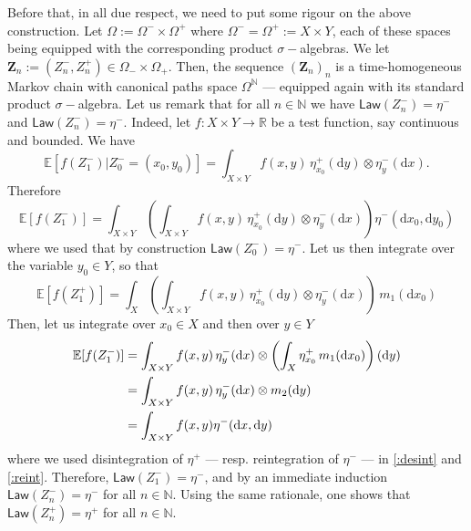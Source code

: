 \documentclass[leqno, 11pt, a4paper]{amsart}
\theoremstyle{definition}
\newcommand{\cZ}{\mathbf{Z}}
\newcommand{\R}{\mathbb{R}}
\newcommand{\E}{\mathbb{E}}
\newcommand{\N}{\mathbb{N}}
\newcommand{\law}{\textsf{Law}}
\newcommand{\dd}{\mathrm{d}}
\begin{document}
 Before that, in all due respect, we need to put some rigour on the above construction. Let $\Omega := \Omega^- \times \Omega^+$ where $\Omega^- = \Omega^+ := X \times Y$, each of these spaces being equipped with the corresponding product $\sigma-$algebras. We let $\cZ_n := (Z_n^-, Z_n^+) \in \Omega_- \times \Omega_+$. Then, the sequence $(\cZ_n)_n$ is a time-homogeneous Markov chain with canonical paths space $\Omega^\N$ --- equipped again with its standard product $\sigma-$algebra. Let us remark that for all $n \in \N$ we have $\law(Z_n^-) = \eta^-$ and $\law(Z_n^-) = \eta^{-}$. Indeed, let $f : X \times Y \to \R$ be a test function, say continuous and bounded. We have
$$
 	\E[f(Z_1^-) | Z_{0}^- = (x_0, y_0)] = \int_{X \times Y} f(x, y) \,  \eta^+_{x_{0}}(\dd y) \otimes \eta^-_y(\dd x).
$$
 Therefore
$$
 	\E[f(Z_1^-)] = \int_{X \times Y }\left(\int_{X \times Y } f(x, y) \, \eta^+_{x_{0}}(\dd y) \otimes \eta^-_y(\dd x)\right) \eta^-(\dd x_{0},\dd  y_{0})
$$
 where we used that by construction $\law(Z_0^-) = \eta^-$. Let us then integrate over the variable $y_{0} \in Y$, so that
$$
 	\E[f(Z_1^+)] = \int_{X}\left(\int_{X \times Y } f(x, y) \,  \eta^+_{x_{0}}(\dd y) \otimes \eta^-_y(\dd x)\right) \, m_1(\dd x_0)
$$
 Then, let us integrate over $x_0 \in X$ and then over $y \in Y$
 \begin{align}
 	\notag \E[f(Z_1^-)]  &= \int_{X \times Y} f(x, y)\,  \eta^-_y(\dd x) \otimes \left(\int_{X} \eta^+_{x_{0}} \,  m_1(\dd x_0 )\right)(\dd y)
 	\\ 	\label{:desint}& = \int_{X \times Y} f(x, y) \, \eta^-_y(\dd x) \otimes m_2(\dd y)
 	\\ \label{:reint}&= \int_{X \times Y} f(x, y) \eta^-(\dd x, \dd y)
 \end{align}
 where we used disintegration of $\eta^+$ — resp. reintegration of $\eta^-$ — in \eqref{:desint} and \eqref{:reint}. Therefore, $\law(Z_1^-) = \eta^-$, and by an immediate induction $\law(Z_n^-) = \eta^-$ for all $n \in \N$. Using the same rationale, one shows that $\law(Z_n^+) = \eta^+$ for all $n \in \N$. 
 
\end{document}
